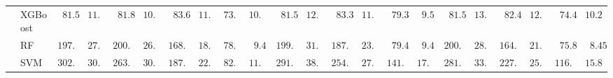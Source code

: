 \begin{tabular}{p{0.2cm}p{1cm}|p{0.6cm}p{0.6cm}|p{0.6cm}p{0.6cm}p{0.6cm}p{0.6cm}p{0.6cm}p{0.6cm}|p{0.6cm}p{0.6cm}p{0.6cm}p{0.6cm}p{0.6cm}p{0.6cm}|p{0.6cm}p{0.6cm}p{0.6cm}p{0.6cm}p{0.6cm}p{0.6cm}}
 & XGBoost  & $\phantom{0}81.50$ & $11.91$ & $\phantom{0}81.88$ & $10.71$ & $\phantom{0}83.66$ & $11.57$ & $73.85$ & $10.38$ & $\phantom{0}81.59$ & $12.06$ & $\phantom{0}83.32$ & $11.49$ & $\phantom{0}79.39$ & $\phantom{0}9.53$ & $\phantom{0}81.52$ & $13.48$ & $\phantom{0}82.41$ & $12.54$ & $\phantom{0}74.43$ & $10.21$ \\
 & RF  & $197.24$ & $27.79$ & $200.16$ & $26.69$ & $168.74$ & $18.86$ & $78.56$ & $\phantom{0}9.45$ & $199.18$ & $31.30$ & $187.66$ & $23.04$ & $\phantom{0}79.45$ & $\phantom{0}9.49$ & $200.43$ & $28.80$ & $164.34$ & $21.50$ & $\phantom{0}75.85$ & $\phantom{0}8.45$ \\
 & SVM  & $302.19$ & $30.36$ & $263.81$ & $30.37$ & $187.68$ & $22.31$ & $82.96$ & $11.89$ & $291.40$ & $38.02$ & $254.60$ & $27.34$ & $141.17$ & $17.27$ & $281.04$ & $33.10$ & $227.25$ & $25.80$ & $116.19$ & $15.89$ \\
\hline 
\end{tabular}


